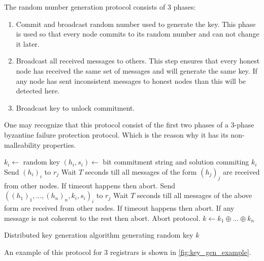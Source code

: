 The random number generation protocol consists of 3 phases:
\begin{enumerate}
  \item Commit and broadcast random number used to generate the key. This phase
    is used so that every node commits to its random number and can not change
    it later.
  \item Broadcast all received messages to others. This step ensures that every
    honest node has received the same set of messages and will generate the same
    key. If any node has sent inconsistent messages to honest nodes
    than this will be detected here.
  \item Broadcast key to unlock commitment.
\end{enumerate}

One may recognize that this protocol consist of the first two phases of a
3-phase byzantine failure protection protocol. Which is the reason why it has
its non-malleability properties.

\begin{algorithm}
  \begin{algorithmic}[1]
  \STATE $k_i \leftarrow $ random key
  \STATE $(h_i, s_i) \leftarrow $ bit commitment string and solution commiting
  $k_i$
    \STATE Send $(h_i)_{i}$ to $r_j$
  \ENDFOR
  \STATE Wait $T$ seconds till all messages of the form $(h_j)_j$ are received
  from other nodes. If timeout happens then abort.
    \STATE Send $\left( (h_1)_1, \ldots, (h_n)_{n}, k_i, s_i\right)_i$ to $r_j$
  \ENDFOR
  \STATE Wait $T$ seconds till all messages of the above form are received
  from other nodes. If timeout happens then abort. If any message is not
  coherent to the rest then abort.
      \STATE Abort protocol.
    \ENDIF
  \ENDFOR
  \STATE $k \leftarrow k_1 \oplus \ldots \oplus k_n$
\end{algorithmic}
  \caption{Distributed key generation algorithm generating random key $k$}
  \label{alg:key_gen_alg}
\end{algorithm}

An example of this protocol for 3 registrars is shown in
\ref{fig:key_gen_example}.

